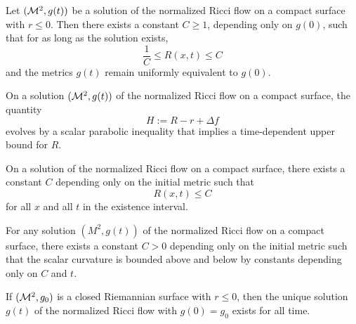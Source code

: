 \begin{proposition}
\label{ch05-prop-curvature-bounds-nonpositive-average}
Let \((\mathcal{M}^2,g(t))\) be a solution of the normalized Ricci flow on a compact surface with \(r\le 0\). Then there exists a constant \(C\ge 1\), depending only on \(g(0)\), such that for as long as the solution exists,
\[
\frac1C \le R(x,t)\le C
\]
and the metrics \(g(t)\) remain uniformly equivalent to \(g(0)\).
\end{proposition}

\begin{proposition}[Evolution of \(H\)]
\label{ch05-prop-H-evolution}
On a solution \((\mathcal{M}^2,g(t))\) of the normalized Ricci flow on a compact surface, the quantity
\[
H:=R-r+\Delta f
\]
evolves by a scalar parabolic inequality that implies a time-dependent upper bound for \(R\).
\end{proposition}

\begin{corollary}
\label{ch05-cor-upper-curvature-control}
On a solution of the normalized Ricci flow on a compact surface, there exists a constant \(C\) depending only on the initial metric such that
\[
R(x,t)\le C
\]
for all \(x\) and all \(t\) in the existence interval.
\end{corollary}

\begin{proposition}
\label{ch05-prop-two-sided-curvature-control}
For any solution \((M^2,g(t))\) of the normalized Ricci flow on a compact surface, there exists a constant \(C>0\) depending only on the initial metric such that the scalar curvature is bounded above and below by constants depending only on \(C\) and \(t\).
\end{proposition}

\begin{proposition}
\label{ch05-prop-long-time-existence-nonpositive}
If \((\mathcal{M}^2,g_0)\) is a closed Riemannian surface with \(r\le 0\), then the unique solution \(g(t)\) of the normalized Ricci flow with \(g(0)=g_0\) exists for all time.
\end{proposition}

